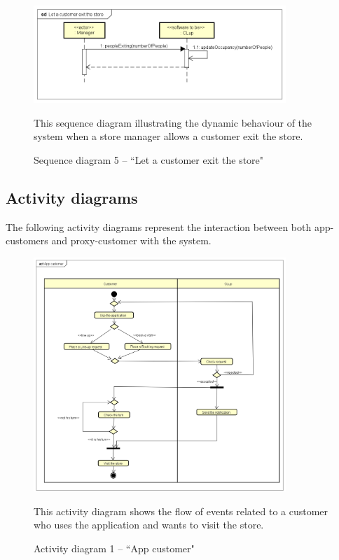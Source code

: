 \documentclass[a4paper,oneside,11pt]{book}   %
\newcommand{\captionrasd}[2]{\caption{#1}\par\begin{center}\vspace{-.01\textheight}\small#2.\end{center}}
\begin{document}
    \begin{figure}[H]
        \centering
        \includegraphics[width=0.85\textwidth, keepaspectratio]{pictures/sequence_diagrams/let_customer_exit_store}
        \captionrasd{Sequence diagram 5 -- ``Let a customer exit the store"}{This sequence diagram illustrating the dynamic behaviour of the system when a store manager allows a customer exit the store}
        \label{figure:sequence_diagram_5_let_customer_exit_store}
    \end{figure}
    
    \subsection{Activity diagrams}
    The following activity diagrams represent the interaction between both app-customers and proxy-customer with the system.
    
    \begin{figure}[H]
        \centering
        \includegraphics[width=0.85\textwidth, keepaspectratio]{pictures/activity_diagrams/app_customer}
        \captionrasd{Activity diagram 1 -- ``App customer"}{This activity diagram shows the flow of events related to a customer who uses the application and wants to visit the store}
        \label{figure:activity_diagram_1_app_customer}
    \end{figure}
    
\end{document}
